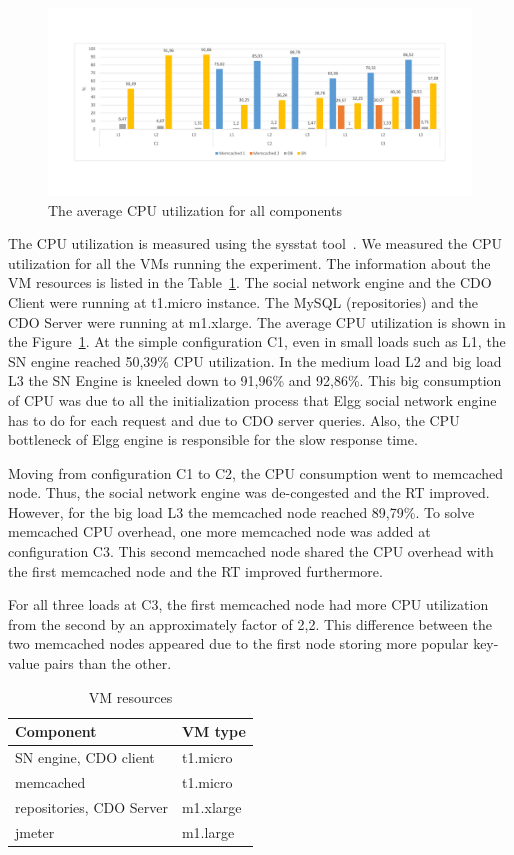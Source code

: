 \begin{figure}[h]
	\centering
	\includegraphics[width=1.1\textwidth]{./fig/UsageAVG.pdf} 
	\caption{The average CPU utilization for all components}
	\label{fig:cpuavg}
\end{figure}

The CPU utilization is measured using the sysstat tool~\cite{sysstat_url}. We measured the CPU utilization for all the VMs running the experiment. The information about the VM resources is listed in the Table~\ref{vms_resources}. The social network engine and the CDO Client were running at t1.micro instance. The MySQL (repositories) and the CDO Server were running at m1.xlarge. The average CPU utilization is shown in the Figure~\ref{fig:cpuavg}. At the simple configuration C1, even in small loads such as L1, the SN engine reached 50,39\% CPU utilization. In the medium load L2 and big load L3 the SN Engine is kneeled down to 91,96\% and 92,86\%. This big consumption of CPU was due to all the initialization process that Elgg social network engine has to do for each request and due to CDO server queries. Also, the CPU bottleneck of Elgg engine is responsible for the slow response time.

Moving from configuration C1 to C2, the CPU consumption went to memcached node. Thus, the social network engine was de-congested and the RT improved. However, for the big load L3 the memcached node reached 89,79\%. To solve memcached CPU overhead, one more memcached node was added at configuration C3. This second memcached node shared the CPU overhead with the first memcached node and the RT improved furthermore. 

For all three loads at C3, the first memcached node had more CPU utilization from the second by an approximately factor of 2,2. This difference between the two memcached nodes appeared due to the first node storing more popular key-value pairs than the other.

\begin{table}[]
\centering
\begin{tabular}{|l|l|}
\hline
 Component &  VM type \\ \hline
 SN engine, CDO client &  t1.micro \\ \hline
 memcached &  t1.micro \\ \hline
 repositories, CDO Server &  m1.xlarge \\ \hline
 jmeter &  m1.large \\ \hline
\end{tabular}
\caption{VM resources}
\label{vms_resources}
\end{table}

